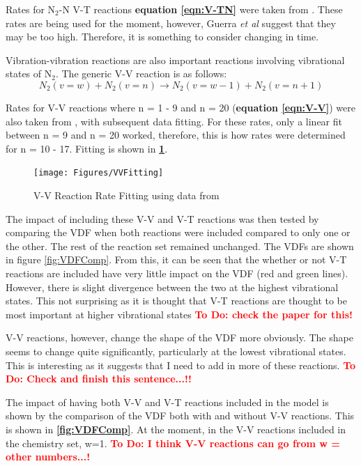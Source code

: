 \documentclass[11pt, oneside]{article}   	%
\newcommand{\todo}[1]{ \textcolor{red}{\bf{To Do:} #1}}
\begin{document}
Rates for N$_2$-N V-T reactions \textbf{equation \ref{eqn:V-TN}} were taken from \cite{Guerra1995non}.
These rates are being used for the moment, however, Guerra \textit{et al} \cite{Guerra2004kinetic} suggest that they may be too high.
Therefore, it is something to consider changing in time.

Vibration-vibration reactions are also important reactions involving vibrational states of N$_2$.
The generic V-V reaction is as follows:
\begin{equation}
N_2(v=w) + N_2 (v=n) \rightarrow N_2(v=w-1) + N_2(v=n+1)
\label{eqn:V-V}
\end{equation}

Rates for V-V reactions where n = 1 - 9 and n = 20 (\textbf{equation \ref{eqn:V-V}}) were also taken from \cite{Billing1979vv}, with subsequent data fitting.
For these rates, only a linear fit between n = 9 and n = 20 worked, therefore, this is how rates were determined for n = 10 - 17.
Fitting is shown in \textbf{\ref{fig:VVFit}}.

\begin{figure}
\begin{center}
\texttt{[image: Figures/VVFitting]}
\caption{V-V Reaction Rate Fitting using data from \cite{Billing1979vv}}
\label{fig:VVFit}
\end{center}
\end{figure}

The impact of including these V-V and V-T reactions was then tested by comparing the VDF when both reactions were included compared to only one or the other. 
The rest of the reaction set remained unchanged.
The VDFs are shown in figure \ref{fig:VDFComp}.
From this, it can be seen that the whether or not V-T reactions are included have very little impact on the VDF (red and green lines).
However, there is slight divergence between the two at the highest vibrational states.
This not surprising as it is thought that V-T reactions are thought to be most important at higher vibrational states \cite{Guerra2004kinetic} \todo{check the paper for this!}

V-V reactions, however, change the shape of the VDF more obviously.
The shape seems to change quite significantly, particularly at the lowest vibrational states.
This is interesting as it suggests that I need to add in more of these reactions. \todo{Check and finish this sentence...!!}

The impact of having both V-V and V-T reactions included in the model is shown by the comparison of the VDF both with and without V-V reactions.
This is shown in \textbf{\ref{fig:VDFComp}}.
At the moment, in the V-V reactions included in the chemistry set, w=1.
\todo{I think V-V reactions can go from w = other numbers...!}
\end{document}
